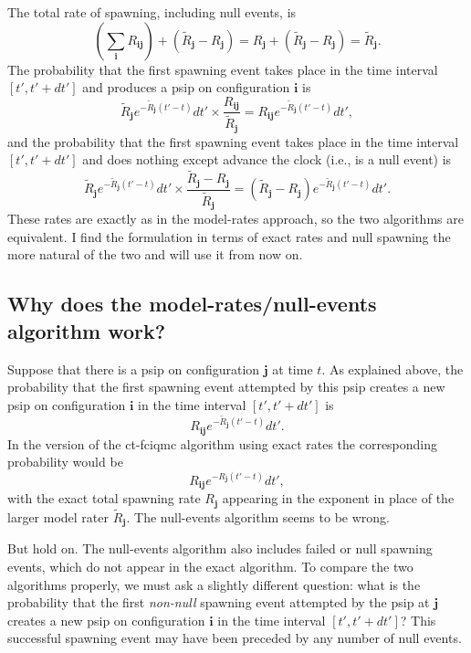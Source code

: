 \documentclass[a4paper, 11pt]{article}
\newcommand{\bi}{\mathbf{i}}
\newcommand{\bj}{\mathbf{j}}
\begin{document}
The total rate of spawning, including null events, is
\begin{equation*}
  \left ( \sum_{\bi} R_{\bi\bj} \right ) 
  + \left ( \tilde{R}_{\bj} - R_{\bj} \right ) 
  = R_{\bj} + \left ( \tilde{R}_{\bj} - R_{\bj} \right ) = \tilde{R}_{\bj}.
\end{equation*}
The probability that the first spawning event takes place in the time
interval $[t',t'+dt']$ and produces a psip on configuration $\bi$ is
\begin{equation*}
  \tilde{R}_{\bj} e^{-\tilde{R}_{\bj}(t'-t)} dt' \times
  \frac{R_{\bi\bj}}{\tilde{R}_{\bj}} = R_{\bi\bj}
  e^{-\tilde{R}_{\bj}(t'-t)} dt',
\end{equation*}
and the probability that the first spawning event takes place in the
time interval $[t',t'+dt']$ and does nothing except advance the clock
(i.e., is a null event) is
\begin{equation*}
  \tilde{R}_{\bj} e^{-\tilde{R}_{\bj}(t'-t)} dt' \times 
  \frac{\tilde{R}_{\bj} - R_{\bj}}{\tilde{R}_{\bj}} =
  \left ( \tilde{R}_{\bj} - R_{\bj} \right ) e^{-\tilde{R}_{\bj}(t'-t)}
  dt' .
\end{equation*}
These rates are exactly as in the model-rates approach, so the two
algorithms are equivalent.  I find the formulation in terms of exact
rates and null spawning the more natural of the two and will use it from
now on.

\subsection*{Why does the model-rates/null-events algorithm work?}

Suppose that there is a psip on configuration $\bj$ at time $t$.  As
explained above, the probability that the first spawning event attempted
by this psip creates a new psip on configuration $\bi$ in the time
interval $[t',t'+dt']$ is
\begin{equation*}
R_{\bi\bj} e^{-\tilde{R}_{\bj}(t'-t)} dt' .
\end{equation*}
In the version of the ct-fciqmc algorithm using exact rates the
corresponding probability would be
\begin{equation*}
R_{\bi\bj} e^{-R_{\bj}(t'-t)} dt' ,
\end{equation*}
with the exact total spawning rate $R_{\bj}$ appearing in the exponent
in place of the larger model rater $\tilde{R}_{\bj}$. The null-events
algorithm seems to be wrong.

But hold on. The null-events algorithm also includes failed or null
spawning events, which do not appear in the exact algorithm. To compare
the two algorithms properly, we must ask a slightly different question:
what is the probability that the first \emph{non-null} spawning event
attempted by the psip at $\bj$ creates a new psip on configuration $\bi$
in the time interval $[t',t'+dt']$? This successful spawning event may
have been preceded by any number of null events.
\end{document}
